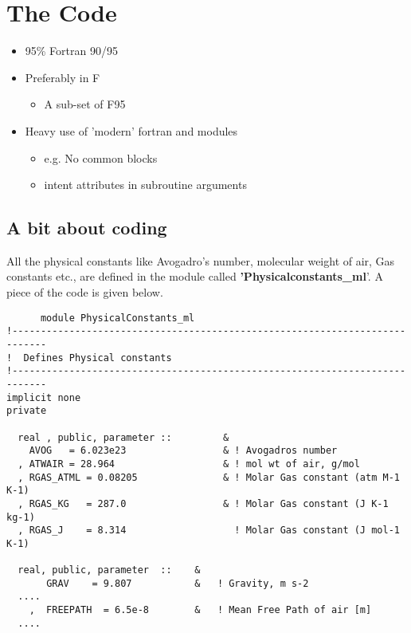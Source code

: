 \chapter{The Code}


\begin{itemize}
\item
95\% Fortran 90/95

\item
Preferably in F
   \begin{itemize}
      \item
        A sub-set of F95
   \end{itemize}

\item
   Heavy use of 'modern' fortran and modules
   \begin{itemize}
      \item
        e.g. No common blocks
      \item
        intent attributes  in subroutine arguments
   \end{itemize}
\end{itemize}

\newpage
\section*{A bit about coding}

All the physical constants like Avogadro's number, molecular weight of
air, Gas constants etc., are defined in the module called
{\bf 'Physicalconstants\_ml}'. A piece of the code is given below. \\
 
\begin{verbatim}
      module PhysicalConstants_ml
!----------------------------------------------------------------------------
!  Defines Physical constants
!----------------------------------------------------------------------------
implicit none
private

  real , public, parameter ::         &
    AVOG   = 6.023e23                 & ! Avogadros number
  , ATWAIR = 28.964                   & ! mol wt of air, g/mol
  , RGAS_ATML = 0.08205               & ! Molar Gas constant (atm M-1 K-1)
  , RGAS_KG   = 287.0                 & ! Molar Gas constant (J K-1 kg-1)
  , RGAS_J    = 8.314                   ! Molar Gas constant (J mol-1 K-1)

  real, public, parameter  ::    &
       GRAV    = 9.807           &   ! Gravity, m s-2
  ....
    ,  FREEPATH  = 6.5e-8        &   ! Mean Free Path of air [m]
  ....

\end{verbatim}

